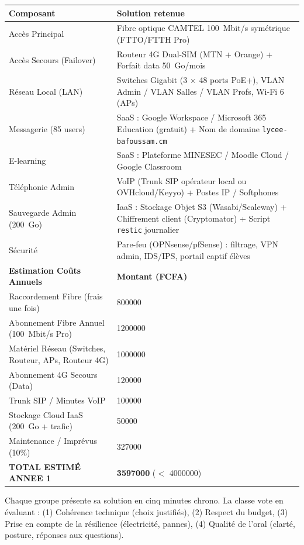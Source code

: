 \documentclass[11pt]{article}
\begin{document}
\begin{exoresolu}
\begin{center}
\begin{tabularx}{\linewidth}{|l|X|}
\hline
\rowcolor{popblueL} \textbf{Composant} & \textbf{Solution retenue} \\
\hline
Accès Principal & Fibre optique CAMTEL \SI{100}{Mbit/s} symétrique (FTTO/FTTH Pro) \\
\hline
Accès Secours (Failover) & Routeur 4G Dual-SIM (MTN + Orange) + Forfait data \SI{50}{Go}/mois \\
\hline
Réseau Local (LAN) & Switches Gigabit (3 $\times$ 48 ports PoE+), VLAN Admin / VLAN Salles / VLAN Profs, Wi-Fi 6 (APs) \\
\hline
Messagerie (85 users) & SaaS : Google Workspace / Microsoft 365 Education (gratuit) + Nom de domaine \texttt{lycee-bafoussam.cm} \\
\hline
E-learning & SaaS : Plateforme MINESEC / Moodle Cloud / Google Classroom \\
\hline
Téléphonie Admin & VoIP (Trunk SIP opérateur local ou OVHcloud/Keyyo) + Postes IP / Softphones \\
\hline
Sauvegarde Admin (\SI{200}{Go}) & IaaS : Stockage Objet S3 (Wasabi/Scaleway) + Chiffrement client (Cryptomator) + Script \texttt{restic} journalier \\
\hline
Sécurité & Pare-feu (OPNsense/pfSense) : filtrage, VPN admin, IDS/IPS, portail captif élèves \\
\hline
\hline
\rowcolor{popblueL} \textbf{Estimation Coûts Annuels} & \textbf{Montant (FCFA)} \\
\hline
Raccordement Fibre (frais une fois) & \num{800000} \\
Abonnement Fibre Annuel (\SI{100}{Mbit/s} Pro) & \num{1200000} \\
Matériel Réseau (Switches, Routeur, APs, Routeur 4G) & \num{1000000} \\
Abonnement 4G Secours (Data) & \num{120000} \\
Trunk SIP / Minutes VoIP & \num{100000} \\
Stockage Cloud IaaS (\SI{200}{Go} + trafic) & \num{50000} \\
Maintenance / Imprévus (10\%) & \num{327000} \\
\hline
\textbf{TOTAL ESTIMÉ ANNEE 1} & \textbf{\num{3597000}} ($<$ \num{4000000}) \\
\hline
\end{tabularx}
\end{center}

Chaque groupe présente sa solution en cinq minutes chrono. La classe vote en évaluant : (1) Cohérence technique (choix justifiés), (2) Respect du budget, (3) Prise en compte de la résilience (électricité, pannes), (4) Qualité de l'oral (clarté, posture, réponses aux questions).

\end{exoresolu}
\end{document}
